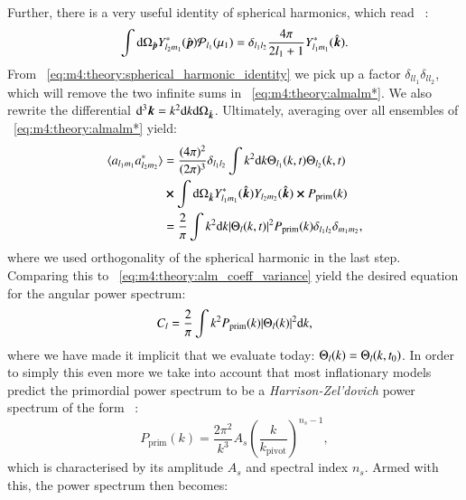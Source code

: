         Further, there is a very useful identity of spherical harmonics, which read ~\cite{dodelson2020modern}:
        \begin{equation}\label{eq:m4:theory:spherical_harmonic_identity}
            \int\mathrm{d}\Omega_{\hat{\boldsymbol{p}}}Y^*_{l_2m_1}({\hat{\boldsymbol{p}}})\mathcal{P}_{l_1}(\mu_1) = \delta_{l_1l_2}\frac{4\pi}{2l_1+1}Y_{l_1m_1}^*({\hat{\boldsymbol{k}}}).
        \end{equation}
        From ~\cref{eq:m4:theory:spherical_harmonic_identity} we pick up a factor $\delta_{ll_1}\delta_{ll_2}$, which will remove the two infinite sums in ~\cref{eq:m4:theory:almalm*}. We also rewrite the differential $\mathrm{d}^3\boldsymbol{k} = k^2\mathrm{d} k\mathrm{d}\Omega_{\hat{\boldsymbol{k}}}$. Ultimately, averaging over all ensembles of ~\cref{eq:m4:theory:almalm*} yield:
        \begin{equation}\label{eq:m4:theory:getting_to_the C_l}
            \begin{split}
                \langle a_{l_1m_1}a_{l_2m_2}^*\rangle &= \frac{(4\pi)^2}{(2\pi)^3}\delta_{l_1l_2}\int k^2\mathrm{d} k\Theta_{l_1}(k,t)\Theta_{l_2}(k,t) \\
                &\cross \int\mathrm{d}\Omega_{\hat{\boldsymbol{k}}}Y_{l_1m_1}^*({\hat{\boldsymbol{k}}})Y_{l_2m_2}({\hat{\boldsymbol{k}}})\cross P_\mathrm{prim}(k)\\
                &= \frac{2}{\pi}\int k^2\mathrm{d} k\abs{\Theta_l(k,t)}^2P_\mathrm{prim}(k)\delta_{l_1l_2}\delta_{m_1m_2},
            \end{split}
        \end{equation}
        where we used orthogonality of the spherical harmonic in the last step. Comparing this to ~\cref{eq:m4:theory:alm_coeff_variance} yield the desired equation for the angular power spectrum:
        \begin{equation}\label{eq:m4:theory:Cl_integral_intermediate}
            C_l = \frac{2}{\pi}\int k^2 P_\mathrm{prim}(k)\abs{\Theta_l(k)}^2\mathrm{d} k,
        \end{equation}
        where we have made it implicit that we evaluate today: $\Theta_l(k) = \Theta_l(k,t_0)$. In order to simply this even more we take into account that most inflationary models predict the primordial power spectrum to be a \textit{Harrison-Zel'dovich} power spectrum of the form ~\cite{dodelson2020modern}: 
        \begin{equation}\label{eq:m4:theory:primordial_power_spectrum}
            P_\mathrm{prim}(k) = \frac{2\pi^2}{k^3}A_s\left(\frac{k}{k_\mathrm{pivot}}\right)^{n_s-1},
        \end{equation}
        which is characterised by its amplitude $A_s$ and spectral index $n_s$. Armed with this, the power spectrum then becomes:
